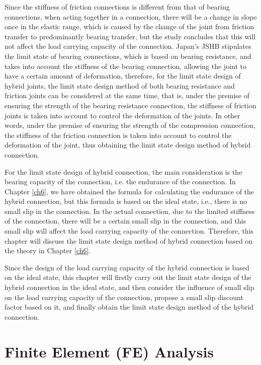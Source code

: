 Since the stiffness of friction connections is different from that of bearing connections, when acting together in a connection, there will be a change in slope once in the elastic range, which is caused by the change of the joint from friction transfer to predominantly bearing transfer, but the study concludes that this will not affect the load carrying capacity of the connection. Japan's JSHB stipulates the limit state of bearing connections, which is based on bearing resistance, and takes into account the stiffness of the bearing connection, allowing the joint to have a certain amount of deformation, therefore, for the limit state design of hybrid joints, the limit state design method of both bearing resistance and friction joints can be considered at the same time, that is, under the premise of ensuring the strength of the bearing resistance connection, the stiffness of friction joints is taken into account to control the deformation of the joints. In other words, under the premise of ensuring the strength of the compression connection, the stiffness of the friction connection is taken into account to control the deformation of the joint, thus obtaining the limit state design method of hybrid connection.

For the limit state design of hybrid connection, the main consideration is the bearing capacity of the connection, i.e. the endurance of the connection. In Chapter \ref{ch6}, we have obtained the formula for calculating the endurance of the hybrid connection, but this formula is based on the ideal state, i.e., there is no small slip in the connection. In the actual connection, due to the limited stiffness of the connection, there will be a certain small slip in the connection, and this small slip will affect the load carrying capacity of the connection. Therefore, this chapter will discuss the limit state design method of hybrid connection based on the theory in Chapter \ref{ch6}.

Since the design of the load carrying capacity of the hybrid connection is based on the ideal state, this chapter will firstly carry out the limit state design of the hybrid connection in the ideal state, and then consider the influence of small slip on the load carrying capacity of the connection, propose a small slip discount factor based on it, and finally obtain the limit state design method of the hybrid connection.

\section{Finite Element (FE) Analysis}


